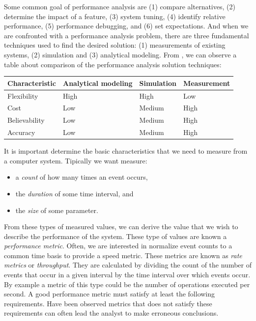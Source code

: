 \documentclass[openany, a4paper]{book}
\theoremstyle{break}
\theoremstyle{example}
\theoremstyle{note}
\theoremstyle{break}
\theoremstyle{exercise}
\begin{document}
Some common goal of performance analysis are (1) compare alternatives, (2)
determine the impact of a feature, (3) system tuning, (4) identify relative
performance, (5) performance debugging, and (6) set expectations. And when we
are confronted with a performance analysis problem, there are three
fundamental techniques used to find the desired solution: (1) measurements of
existing systems, (2) simulation and (3) analytical modeling. From
\cite{lilja2005measuring} , we can observe a table about comparison of the
performance analysis solution techniques:

\begin{center}
\begin{tabular}{llll}
Characteristic & Analytical modeling & Simulation & Measurement\\
\hline
Flexibility & High & High & Low\\
Cost & Low & Medium & High\\
Believability & Low & Medium & High\\
Accuracy & Low & Medium & High\\
\end{tabular}
\end{center}

It is important determine the basic characteristics that we need to measure
from a computer system. Tipically we want measure:

\begin{itemize}
\item a \emph{count} of how many times an event occurs,
\item the \emph{duration} of some time interval, and
\item the \emph{size} of some parameter.
\end{itemize}


From these types of measured values, we can derive the value that we wish to
describe the performance of the system. These type of values are known a
\emph{performance metric}. Often, we are interested in normalize event counts to a
common time basis to provide a speed metric. These metrics are known as \emph{rate
metrics} or \emph{throughput}. They are calculated by dividing the count of the
number of events that occur in a given interval by the time interval over
which events occur. By example a metric of this type could be the number of
operations executed per second. A good performance metric must satisfy at
least the following requirements. Have been observed metrics that does not
satisfy these requirements can often lead the analyst to make erroneous
conclusions.
\end{document}
